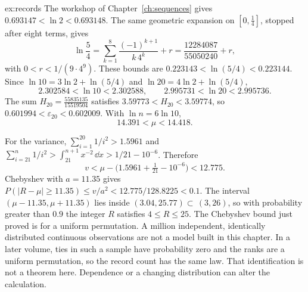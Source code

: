 \begin{solution}{ex:records}
The workshop of Chapter~\ref{ch:sequences} gives $0.693147<\ln2<0.693148$. The same geometric expansion on $[0,\frac14]$, stopped after eight terms, gives
\[
\ln\frac54=\sum_{k=1}^{8}\frac{(-1)^{k+1}}{k\,4^k}+r=\frac{12284087}{55050240}+r,
\]
with $0<r<1/(9\cdot4^9)$. These bounds are $0.223143<\ln(5/4)<0.223144$. Since $\ln10=3\ln2+\ln(5/4)$ and $\ln20=4\ln2+\ln(5/4)$,
\[
2.302584<\ln10<2.302588,\qquad 2.995731<\ln20<2.995736.
\]
The sum $H_{20}=\frac{55835135}{15519504}$ satisfies $3.59773<H_{20}<3.59774$, so $0.601994<\varepsilon_{20}<0.602009$. With $\ln n=6\ln10$,
\[
14.391<\mu<14.418.
\]

For the variance, $\sum_{i=1}^{20}1/i^2>1.5961$ and $\sum_{i=21}^n 1/i^2>\int_{21}^{n+1}x^{-2}\,\dd x>1/21-10^{-6}$. Therefore
\[
v<\mu-\bigl(1.5961+\tfrac1{21}-10^{-6}\bigr)<12.775.
\]
Chebyshev with $a=11.35$ gives $P(|R-\mu|\ge11.35)\le v/a^2<12.775/128.8225<0.1$. The interval $(\mu-11.35,\mu+11.35)$ lies inside $(3.04,25.77)\subset\,(3,26)$, so with probability greater than $0.9$ the integer $R$ satisfies $4\le R\le25$.
The Chebyshev bound just proved is for a uniform permutation. A million independent, identically distributed continuous observations are not a model built in this chapter. In a later volume, ties in such a sample have probability zero and the ranks are a uniform permutation, so the record count has the same law. That identification is not a theorem here. Dependence or a changing distribution can alter the calculation.
\end{solution}

